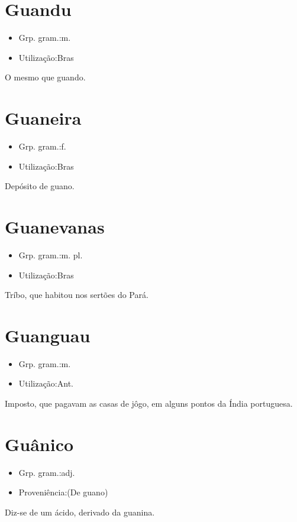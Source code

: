 \section{Guandu}
\begin{itemize}
\item {Grp. gram.:m.}
\end{itemize}
\begin{itemize}
\item {Utilização:Bras}
\end{itemize}
O mesmo que \textunderscore guando\textunderscore .
\section{Guaneira}
\begin{itemize}
\item {Grp. gram.:f.}
\end{itemize}
\begin{itemize}
\item {Utilização:Bras}
\end{itemize}
Depósito de guano.
\section{Guanevanas}
\begin{itemize}
\item {Grp. gram.:m. pl.}
\end{itemize}
\begin{itemize}
\item {Utilização:Bras}
\end{itemize}
Tríbo, que habitou nos sertões do Pará.
\section{Guanguau}
\begin{itemize}
\item {Grp. gram.:m.}
\end{itemize}
\begin{itemize}
\item {Utilização:Ant.}
\end{itemize}
Imposto, que pagavam as casas de jôgo, em alguns pontos da Índia portuguesa.
\section{Guânico}
\begin{itemize}
\item {Grp. gram.:adj.}
\end{itemize}
\begin{itemize}
\item {Proveniência:(De \textunderscore guano\textunderscore )}
\end{itemize}
Diz-se de um ácido, derivado da guanina.
